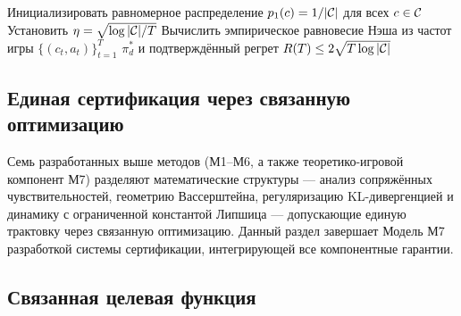 \begin{algorithm}[htbp]
\caption{Теоретико-игровая робастность с онлайн-обучением, учитывающим неопределённость}\label{alg:game}
Инициализировать равномерное распределение $p_1(c) = 1/|\mathcal{C}|$ для всех $c\in\mathcal{C}$\;
Установить $\eta = \sqrt{\log|\mathcal{C}|/T}$\;
Вычислить эмпирическое равновесие Нэша из частот игры $\{(c_t,a_t)\}_{t=1}^T$\;
\Return $\pi_d^*$ и подтверждённый регрет $R(T)\le 2\sqrt{T\log|\mathcal{C}|}$
\end{algorithm}


\subsection{Единая сертификация через связанную оптимизацию}
\label{sec:unified}

Семь разработанных выше методов (М1--М6, а также теоретико-игровой компонент М7) разделяют математические структуры --- анализ сопряжённых чувствительностей, геометрию Вассерштейна, регуляризацию KL-дивергенцией и динамику с ограниченной константой Липшица --- допускающие единую трактовку через связанную оптимизацию. Данный раздел завершает Модель М7 разработкой системы сертификации, интегрирующей все компонентные гарантии.

\subsection{Связанная целевая функция}

